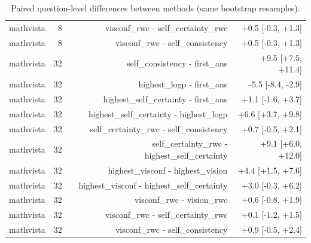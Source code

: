 \begin{table}[t]
\begin{tabular}{lrrr}
mathvista & 8 & visconf\_rwc - self\_certainty\_rwc & +0.5 [-0.3, +1.3] \\
mathvista & 8 & visconf\_rwc - self\_consistency & +0.5 [-0.3, +1.3] \\
mathvista & 32 & self\_consistency - first\_ans & +9.5 [+7.5, +11.4] \\
mathvista & 32 & highest\_logp - first\_ans & -5.5 [-8.4, -2.9] \\
mathvista & 32 & highest\_self\_certainty - first\_ans & +1.1 [-1.6, +3.7] \\
mathvista & 32 & highest\_self\_certainty - highest\_logp & +6.6 [+3.7, +9.8] \\
mathvista & 32 & self\_certainty\_rwc - self\_consistency & +0.7 [-0.5, +2.1] \\
mathvista & 32 & self\_certainty\_rwc - highest\_self\_certainty & +9.1 [+6.0, +12.0] \\
mathvista & 32 & highest\_visconf - highest\_vision & +4.4 [+1.5, +7.6] \\
mathvista & 32 & highest\_visconf - highest\_self\_certainty & +3.0 [-0.3, +6.2] \\
mathvista & 32 & visconf\_rwc - vision\_rwc & +0.6 [-0.8, +1.9] \\
mathvista & 32 & visconf\_rwc - self\_certainty\_rwc & +0.1 [-1.2, +1.5] \\
mathvista & 32 & visconf\_rwc - self\_consistency & +0.9 [-0.5, +2.4] \\
\bottomrule
\end{tabular}
\caption{Paired question-level differences between methods (same bootstrap resamples).}
\label{tab:task3_paired}
\end{table}
